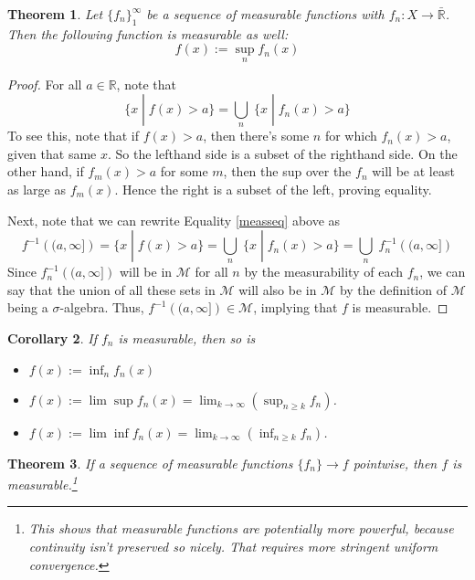 \documentclass[12pt]{article}
\theoremstyle{plain}
\newtheorem{thm}{Theorem}[subsection]
\newtheorem{cor}[thm]{Corollary}
\theoremstyle{definition}
\theoremstyle{remark}
\begin{document}
\begin{thm}
Let $\{f_n\}^\infty_1$ be a sequence of measurable functions with $f_n: X\rightarrow\bar{\mathbb{R}}$. Then the following function is measurable as well:
    \[ f(x) := \sup_n f_n(x) \]
\end{thm}
\begin{proof}
For all $a\in\mathbb{R}$, note that 
\begin{equation}
    \label{measseq}
    \{x \; | \; f(x) > a \} = \bigcup_n \; \{x \; | \; f_n(x)>a\}
\end{equation}
To see this, note that if $f(x)>a$, then there's some $n$ for which $f_n(x)>a$, given that same $x$. So the lefthand side is a subset of the righthand side. On the other hand, if $f_m(x)>a$ for some $m$, then the sup over the $f_n$ will be at least as large as $f_m(x)$. Hence the right is a subset of the left, proving equality.

Next, note that we can rewrite Equality \ref{measseq} above as 
\[ 
    f^{-1}\left((a,\infty]\right) = 
    \{x \; | \; f(x) > a \} = \bigcup_n \; \{x \; | \; f_n(x)>a\}
    = \bigcup_n \; f_n^{-1}\left((a,\infty]\right) 
\]
Since $f_n^{-1}\left((a,\infty]\right)$ will be in $\mathscr{M}$ for all $n$ by the measurability of each $f_n$, we can say that the union of all these sets in $\mathscr{M}$ will also be in $\mathscr{M}$ by the definition of $\mathscr{M}$ being a $\sigma$-algebra. Thus, $f^{-1}\left( (a, \infty]\right) \in\mathscr{M}$, implying that $f$ is measurable.
\end{proof}

\begin{cor}
If $f_n$ is measurable, then so is 
\begin{itemize}
    \item $f(x) := \inf_n f_n(x)$
    \item $f(x) := \lim \sup f_n(x) = \lim_{k\rightarrow\infty} \left(\sup_{n\geq k} f_n\right)$.
    \item $f(x) := \lim \inf f_n(x) = \lim_{k\rightarrow\infty} \left(\inf_{n\geq k} f_n\right)$.
\end{itemize}
\end{cor}

\begin{thm}
\label{convmeas}
If a sequence of measurable functions $\{f_n\}\rightarrow f$ pointwise, then $f$ is measurable.\footnote{This shows that measurable functions are potentially more powerful, because continuity isn't preserved so nicely. That requires more stringent uniform convergence.}
\end{thm}
\end{document}

